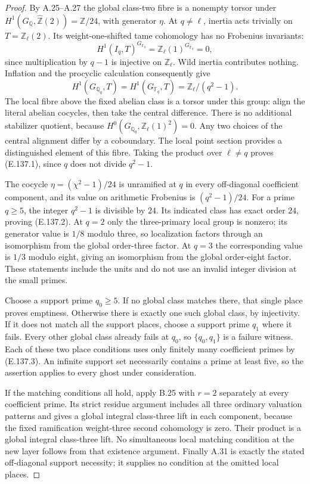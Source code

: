 \begin{proof}
By A.25--A.27 the global class-two fibre is a nonempty torsor
under $H^1(G_{\mathbb Q},\widehat{\mathbb Z}(2))
=\mathbb Z/24$, with generator $\eta$.
At $q\ne\ell$, inertia acts trivially on $T=\mathbb Z_\ell(2)$.
Its weight-one-shifted tame cohomology has no Frobenius invariants:
\[
 H^1(I_q,T)^{G_{\mathbb F_q}}
 =\mathbb Z_\ell(1)^{G_{\mathbb F_q}}=0,
\]
since multiplication by $q-1$ is injective on $\mathbb Z_\ell$.
Wild inertia contributes nothing. Inflation and the procyclic
calculation consequently give
\[
 H^1(G_{\mathbb Q_q},T)
 =H^1(G_{\mathbb F_q},T)
 =\mathbb Z_\ell/(q^2-1).
 \tag{E.137.3}
\]
The local fibre above the fixed abelian class is a torsor under
this group: align the literal abelian cocycles, then take the
central difference. There is no additional stabilizer quotient,
because $H^0(G_{\mathbb Q_q},\mathbb Z_\ell(1)^2)=0$.
Any two choices of the central alignment differ by a coboundary.
The local point section provides a distinguished element of this
fibre. Taking the product over $\ell\ne q$ proves (E.137.1),
since $q$ does not divide $q^2-1$.

The cocycle $\eta=(\chi^2-1)/24$ is unramified at $q$ in
every off-diagonal coefficient component, and its value on
arithmetic Frobenius is $(q^2-1)/24$. For a prime $q\ge5$,
the integer $q^2-1$ is divisible by $24$. Its indicated class
has exact order $24$, proving (E.137.2). At $q=2$ only the
three-primary local group is nonzero; its generator value is
$1/8$ modulo three, so localization factors through an isomorphism
from the global order-three factor. At $q=3$ the corresponding
value is $1/3$ modulo eight, giving an isomorphism from the global
order-eight factor. These statements include the units and do
not use an invalid integer division at the small primes.

Choose a support prime $q_0\ge5$. If no global class matches
there, that single place proves emptiness. Otherwise there is
exactly one such global class, by injectivity. If it does not
match all the support places, choose a support prime $q_1$
where it fails. Every other global class already fails at $q_0$,
so $\{q_0,q_1\}$ is a failure witness. Each of these two
place conditions uses only finitely many coefficient primes
by (E.137.3). An infinite support set necessarily contains a
prime at least five, so the assertion applies to every ghost
under consideration.

If the matching conditions all hold, apply B.25 with $r=2$
separately at every coefficient prime. Its strict residue argument
includes all three ordinary valuation patterns and gives a global
integral class-three lift in each component, because the fixed
ramification weight-three second cohomology is zero. Their product
is a global integral class-three lift. No simultaneous local
matching condition at the new layer follows from that existence
argument. Finally A.31 is exactly the stated off-diagonal support
necessity; it supplies no condition at the omitted local places.
\end{proof}


